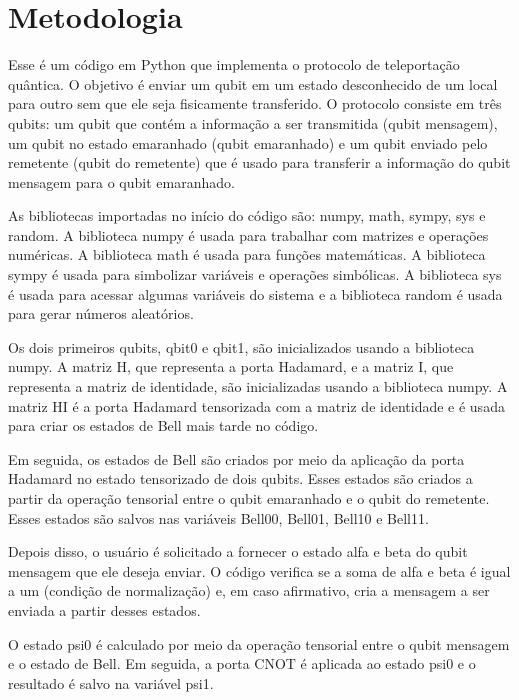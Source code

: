 
\chapter{Metodologia}
Esse é um código em Python que implementa o protocolo de teleportação quântica. O objetivo é enviar um qubit em um estado desconhecido de um local para outro sem que ele seja fisicamente transferido. O protocolo consiste em três qubits: um qubit que contém a informação a ser transmitida (qubit mensagem), um qubit no estado emaranhado (qubit emaranhado) e um qubit enviado pelo remetente (qubit do remetente) que é usado para transferir a informação do qubit mensagem para o qubit emaranhado.

As bibliotecas importadas no início do código são: numpy, math, sympy, sys e random. A biblioteca numpy é usada para trabalhar com matrizes e operações numéricas. A biblioteca math é usada para funções matemáticas. A biblioteca sympy é usada para simbolizar variáveis e operações simbólicas. A biblioteca sys é usada para acessar algumas variáveis ​​do sistema e a biblioteca random é usada para gerar números aleatórios.

Os dois primeiros qubits, qbit0 e qbit1, são inicializados usando a biblioteca numpy. A matriz H, que representa a porta Hadamard, e a matriz I, que representa a matriz de identidade, são inicializadas usando a biblioteca numpy. A matriz HI é a porta Hadamard tensorizada com a matriz de identidade e é usada para criar os estados de Bell mais tarde no código.

Em seguida, os estados de Bell são criados por meio da aplicação da porta Hadamard no estado tensorizado de dois qubits. Esses estados são criados a partir da operação tensorial entre o qubit emaranhado e o qubit do remetente. Esses estados são salvos nas variáveis Bell00, Bell01, Bell10 e Bell11.

Depois disso, o usuário é solicitado a fornecer o estado alfa e beta do qubit mensagem que ele deseja enviar. O código verifica se a soma de alfa e beta é igual a um (condição de normalização) e, em caso afirmativo, cria a mensagem a ser enviada a partir desses estados.

O estado psi0 é calculado por meio da operação tensorial entre o qubit mensagem e o estado de Bell. Em seguida, a porta CNOT é aplicada ao estado psi0 e o resultado é salvo na variável psi1.

